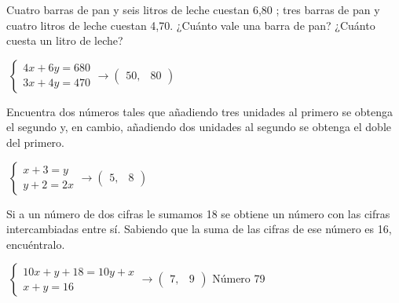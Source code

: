 \documentclass[addpoints,spanish, 12pt,a4paper]{exam}
\begin{document}
\begin{questions}
\question[1] Cuatro barras de pan y seis litros de leche cuestan 6,80 ; tres barras de pan y cuatro
litros de leche cuestan 4,70. ¿Cuánto vale una barra de pan? ¿Cuánto cuesta un
litro de leche?
\begin{solution} $\mathrm{~} \begin{cases} 4 x + 6 y = 680\\3 x + 4 y = 470\end{cases} \to \begin{pmatrix}50, & 80\end{pmatrix}$\end{solution}

\question[1] Encuentra dos números tales que añadiendo tres unidades al primero se obtenga el
segundo y, en cambio, añadiendo dos unidades al segundo se obtenga el doble del primero.
\begin{solution} $\mathrm{~} \begin{cases} x + 3 = y\\y + 2 = 2 x\end{cases} \to \begin{pmatrix}5, & 8\end{pmatrix}$\end{solution}

\question[2] Si a un número de dos cifras le sumamos 18 se obtiene un número con las cifras intercambiadas entre sí. Sabiendo que la suma de las cifras de ese número es 16, encuéntralo.
\begin{solution} $\mathrm{~} \begin{cases} 10x + y + 18 = 10y + x \\ x + y = 16\end{cases} \to \begin{pmatrix}7, & 9\end{pmatrix} $ Número 79 \end{solution}

\addpoints

\end{questions}
\end{document}
